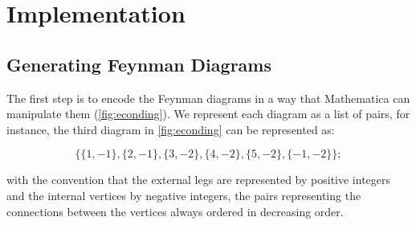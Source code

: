 \documentclass[main.tex]{subfiles}
\begin{document}
\section{Implementation}

\subsection{Generating Feynman Diagrams}

The first step is to encode the Feynman diagrams in a way that Mathematica can manipulate them (\cref{fig:econding}).
We represent each diagram as a list of pairs, for instance, the third diagram in \cref{fig:econding} can be represented as:

\begin{equation*}
    \{\{1,-1\},\{2,-1\},\{3,-2\},\{4,-2\},\{5,-2\},\{-1,-2\}\};
\end{equation*}

with the convention that the external legs are represented by positive integers and the internal vertices by negative integers, the 
pairs representing the connections between the vertices always ordered in decreasing order.
\end{document}
